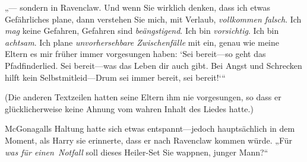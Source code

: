 „— sondern in Ravenclaw. Und wenn Sie wirklich denken, dass ich etwas Gefährliches plane, dann verstehen Sie mich, mit Verlaub, \emph{vollkommen falsch}. Ich \emph{mag} keine Gefahren, Gefahren sind \emph{beängstigend}. Ich bin \emph{vorsichtig}. Ich bin \emph{achtsam}. Ich plane \emph{unvorhersehbare Zwischenfälle} mit ein, genau wie meine Eltern es mir früher immer vorgesungen haben: ‘Sei bereit—so geht das Pfadfinderlied. Sei bereit—was das Leben dir auch gibt. Bei Angst und Schrecken hilft kein Selbstmitleid—Drum sei immer bereit, sei bereit!‘“

(Die anderen Textzeilen hatten seine Eltern ihm nie vorgesungen, so dass er glücklicherweise keine Ahnung vom wahren Inhalt des Liedes hatte.)

McGonagalls Haltung hatte sich etwas entspannt—jedoch hauptsächlich in dem Moment, als Harry sie erinnerte, dass er nach Ravenclaw kommen würde. „Für \emph{was für einen\linebreak\ Notfall} soll dieses Heiler-Set Sie wappnen, junger Mann?“

